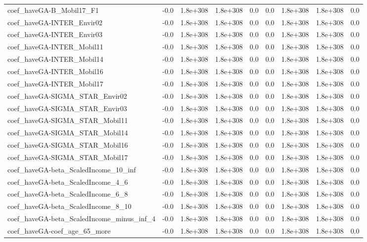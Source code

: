 \begin{tabular}{lrrrrrrrr}
coef_haveGA-B_Mobil17_F1 & -0.0 & 1.8e+308 & 1.8e+308 & 0.0 & 0.0 & 1.8e+308 & 1.8e+308 & 0.0 \\
coef_haveGA-INTER_Envir02 & -0.0 & 1.8e+308 & 1.8e+308 & 0.0 & 0.0 & 1.8e+308 & 1.8e+308 & 0.0 \\
coef_haveGA-INTER_Envir03 & -0.0 & 1.8e+308 & 1.8e+308 & 0.0 & 0.0 & 1.8e+308 & 1.8e+308 & 0.0 \\
coef_haveGA-INTER_Mobil11 & -0.0 & 1.8e+308 & 1.8e+308 & 0.0 & 0.0 & 1.8e+308 & 1.8e+308 & 0.0 \\
coef_haveGA-INTER_Mobil14 & -0.0 & 1.8e+308 & 1.8e+308 & 0.0 & 0.0 & 1.8e+308 & 1.8e+308 & 0.0 \\
coef_haveGA-INTER_Mobil16 & -0.0 & 1.8e+308 & 1.8e+308 & 0.0 & 0.0 & 1.8e+308 & 1.8e+308 & 0.0 \\
coef_haveGA-INTER_Mobil17 & -0.0 & 1.8e+308 & 1.8e+308 & 0.0 & 0.0 & 1.8e+308 & 1.8e+308 & 0.0 \\
coef_haveGA-SIGMA_STAR_Envir02 & -0.0 & 1.8e+308 & 1.8e+308 & 0.0 & 0.0 & 1.8e+308 & 1.8e+308 & 0.0 \\
coef_haveGA-SIGMA_STAR_Envir03 & -0.0 & 1.8e+308 & 1.8e+308 & 0.0 & 0.0 & 1.8e+308 & 1.8e+308 & 0.0 \\
coef_haveGA-SIGMA_STAR_Mobil11 & -0.0 & 1.8e+308 & 1.8e+308 & 0.0 & 0.0 & 1.8e+308 & 1.8e+308 & 0.0 \\
coef_haveGA-SIGMA_STAR_Mobil14 & -0.0 & 1.8e+308 & 1.8e+308 & 0.0 & 0.0 & 1.8e+308 & 1.8e+308 & 0.0 \\
coef_haveGA-SIGMA_STAR_Mobil16 & -0.0 & 1.8e+308 & 1.8e+308 & 0.0 & 0.0 & 1.8e+308 & 1.8e+308 & 0.0 \\
coef_haveGA-SIGMA_STAR_Mobil17 & -0.0 & 1.8e+308 & 1.8e+308 & 0.0 & 0.0 & 1.8e+308 & 1.8e+308 & 0.0 \\
coef_haveGA-beta_ScaledIncome_10_inf & -0.0 & 1.8e+308 & 1.8e+308 & 0.0 & 0.0 & 1.8e+308 & 1.8e+308 & 0.0 \\
coef_haveGA-beta_ScaledIncome_4_6 & -0.0 & 1.8e+308 & 1.8e+308 & 0.0 & 0.0 & 1.8e+308 & 1.8e+308 & 0.0 \\
coef_haveGA-beta_ScaledIncome_6_8 & -0.0 & 1.8e+308 & 1.8e+308 & 0.0 & 0.0 & 1.8e+308 & 1.8e+308 & 0.0 \\
coef_haveGA-beta_ScaledIncome_8_10 & -0.0 & 1.8e+308 & 1.8e+308 & 0.0 & 0.0 & 1.8e+308 & 1.8e+308 & 0.0 \\
coef_haveGA-beta_ScaledIncome_minus_inf_4 & -0.0 & 1.8e+308 & 1.8e+308 & 0.0 & 0.0 & 1.8e+308 & 1.8e+308 & 0.0 \\
coef_haveGA-coef_age_65_more & -0.0 & 1.8e+308 & 1.8e+308 & 0.0 & 0.0 & 1.8e+308 & 1.8e+308 & 0.0 \\

\end{tabular}
